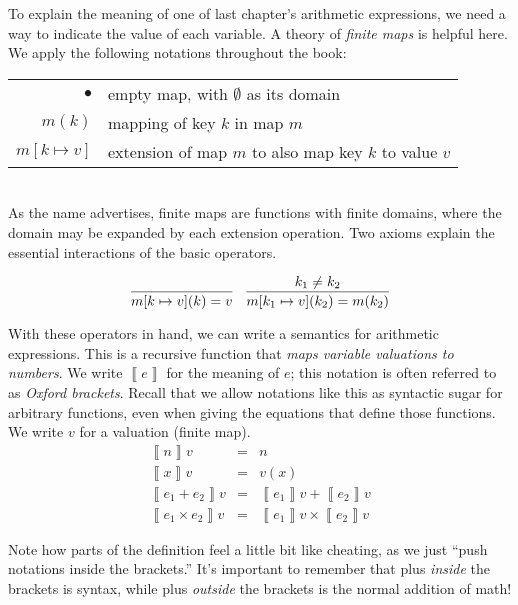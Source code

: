 \documentclass{amsbook}
\theoremstyle{definition}
\theoremstyle{remark}
\numberwithin{section}{chapter}
\numberwithin{equation}{chapter}
\begin{document}
\newcommand{\mempty}[0]{\bullet}
\newcommand{\msel}[2]{#1(#2)}
\newcommand{\mupd}[3]{#1[#2 \mapsto #3]}

To explain the meaning of one of last chapter's arithmetic expressions, we need a way to indicate the value of each variable.
\encoding
A theory of \emph{finite maps} is helpful here.
We apply the following notations throughout the book: \\

\begin{tabular}{rl}
  $\mempty$ & empty map, with $\emptyset$ as its domain \\
  $\msel{m}{k}$ & mapping of key $k$ in map $m$ \\
  $\mupd{m}{k}{v}$ & extension of map $m$ to also map key $k$ to value $v$
\end{tabular} \\

As the name advertises, finite maps are functions with finite domains, where the domain may be expanded by each extension operation.
Two axioms explain the essential interactions of the basic operators.

$$\infer{\msel{\mupd{m}{k}{v}}{k} = v}{}
\quad
\infer{\msel{\mupd{m}{k_1}{v}}{k_2} = m(k_2)}{
  k_1 \neq k_2
}$$

\newcommand{\denote}[1]{{\left \llbracket #1 \right \rrbracket}}

With these operators in hand, we can write a semantics for arithmetic expressions.
This is a recursive function that \emph{maps variable valuations to numbers}.
We write $\denote{e}$ for the meaning of $e$; this notation is often referred to as \emph{Oxford brackets}.
Recall that we allow notations like this as syntactic sugar for arbitrary functions, even when giving the equations that define those functions.
We write $v$ for a valuation (finite map).
\encoding
\begin{eqnarray*}
  \denote{n}v &=& n \\
  \denote{x}v &=& v(x) \\
  \denote{e_1 + e_2}v &=& \denote{e_1}v + \denote{e_2}v \\
  \denote{e_1 \times e_2}v &=& \denote{e_1}v \times \denote{e_2}v
\end{eqnarray*}

Note how parts of the definition feel a little bit like cheating, as we just ``push notations inside the brackets.''
It's important to remember that plus \emph{inside} the brackets is syntax, while plus \emph{outside} the brackets is the normal addition of math!
\end{document}
